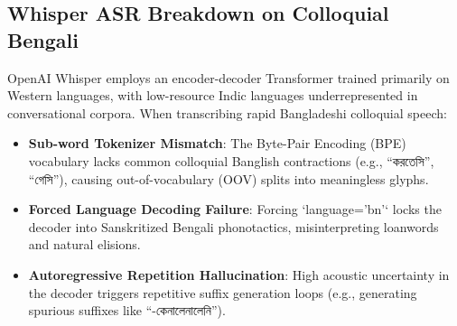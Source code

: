 \documentclass[conference]{IEEEtran}
\begin{document}
\subsection{Whisper ASR Breakdown on Colloquial Bengali}
OpenAI Whisper employs an encoder-decoder Transformer trained primarily on Western languages, with low-resource Indic languages underrepresented in conversational corpora. When transcribing rapid Bangladeshi colloquial speech:
\begin{itemize}
    \item \textbf{Sub-word Tokenizer Mismatch}: The Byte-Pair Encoding (BPE) vocabulary lacks common colloquial Banglish contractions (e.g., ``করতেসি'', ``গেসি''), causing out-of-vocabulary (OOV) splits into meaningless glyphs.
    \item \textbf{Forced Language Decoding Failure}: Forcing `language='bn'` locks the decoder into Sanskritized Bengali phonotactics, misinterpreting loanwords and natural elisions.
    \item \textbf{Autoregressive Repetition Hallucination}: High acoustic uncertainty in the decoder triggers repetitive suffix generation loops (e.g., generating spurious suffixes like ``-কেনালেনালেনি'').
\end{itemize}
\end{document}

